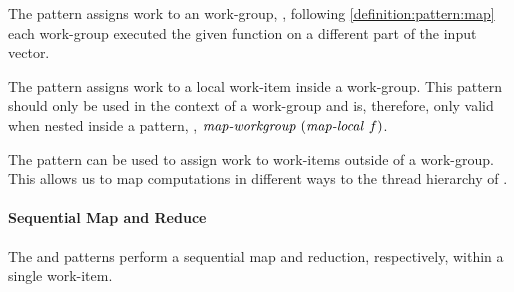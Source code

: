 The \mapWorkgroup pattern assigns work to an \OpenCL work-group, \ie, following \autoref{definition:pattern:map} each \OpenCL work-group executed the given function on a different part of the input vector.

The \mapLocal pattern assigns work to a local work-item inside a work-group.
This pattern should only be used in the context of a work-group and is, therefore, only valid when nested inside a \mapWorkgroup pattern, \eg, $\text{\textit{map-workgroup}}\ (\text{\textit{map-local}}\ f)$.

The \mapGlobal pattern can be used to assign work to work-items outside of a work-group.
This allows us to map computations in different ways to the thread hierarchy of \OpenCL.


\paragraph{Sequential Map and Reduce}
The \mapSeq and \reduceSeq patterns perform a sequential map and reduction, respectively, within a single work-item.


